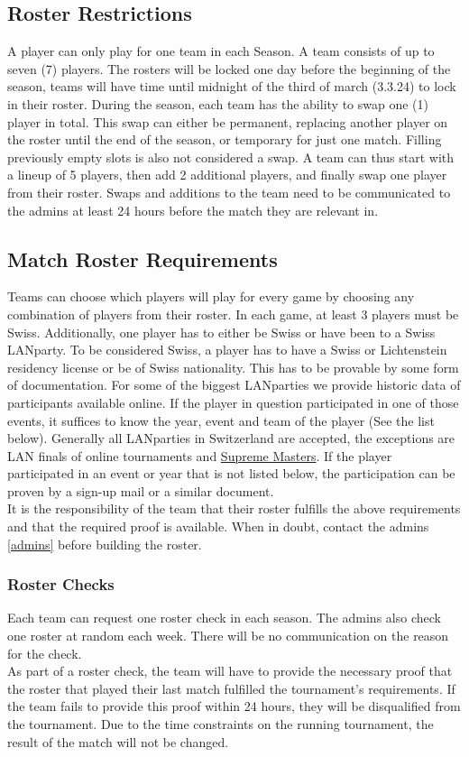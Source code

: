 \documentclass{article}
\begin{document}
\subsection{Roster Restrictions}
A player can only play for one team in each Season. 
A team consists of up to seven (7) players. The rosters will be locked one day before the beginning of the season, teams will have time until midnight of the third of march (3.3.24) to lock in their roster. During the season, each team has the ability to swap one (1) player in total. This swap can either be permanent, replacing another player on the roster until the end of the season, or temporary for just one match. Filling previously empty slots is also not considered a swap. A team can thus start with a lineup of 5 players, then add 2 additional players, and finally swap one player from their roster.
Swaps and additions to the team need to be communicated to the admins at least 24 hours before the match they are relevant in.

\subsection{Match Roster Requirements}
Teams can choose which players will play for every game by choosing any combination of players from their roster.
In each game, at least 3 players must be Swiss. Additionally, one player has to either be Swiss or have been to a Swiss LANparty.
To be considered Swiss, a player has to have a Swiss or Lichtenstein residency license or be of Swiss nationality. This has to be provable by some form of documentation.
For some of the biggest LANparties we provide historic data of participants available online. If the player in question 
participated in one of those events, it suffices to know the year, event and team of the player (See the list below). Generally 
all LANparties in Switzerland are accepted, the exceptions are LAN finals of online tournaments and 
\href{https://www.suprememasters.gg/}{Supreme Masters}. If the player participated in an event or year that is not listed below, 
the participation can be proven by a sign-up mail or a similar document.\\
It is the responsibility of the team that their roster fulfills the above requirements and that the required proof is available. 
When in doubt, contact the admins \ref{admins} before building the roster.

\subsubsection{Roster Checks}
Each team can request one roster check in each season. The admins also check one roster at random each week. There will be no communication on the reason for the check.\\
As part of a roster check, the team will have to provide the necessary proof that the roster that played their last match fulfilled the tournament's requirements. If the team fails to provide this proof within 24 hours, they will be disqualified from the tournament. Due to the time constraints on the running tournament, the result of the match will not be changed.
\end{document}
